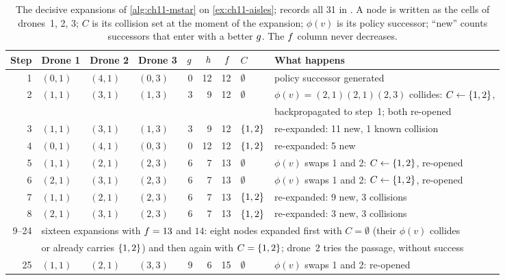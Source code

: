 \begin{table}[!tb]
  \centering\footnotesize
  \caption{The decisive expansions of \cref{alg:ch11-mstar} on
  \cref{ex:ch11-aisles};  records all 31 in
  . A
  node is written as the cells of drones~1, 2, 3; $C$ is its collision set
  at the moment of the expansion; $\phi(v)$ is its policy successor; ``new''
  counts successors that enter \Open with a better $g$. The $f$
  column never decreases.}
  \label{tab:ch11-trace}
  \setlength{\tabcolsep}{3.5pt}
  \begin{tabular}{@{}rlllrrrll@{}}
  \toprule
  Step & Drone 1 & Drone 2 & Drone 3 & $g$ & $h$ & $f$ & $C$ & What happens\\
  \midrule
   1 & $(0,1)$ & $(4,1)$ & $(0,3)$ &  0 & 12 & 12 & $\emptyset$ & policy successor generated\\
   2 & $(1,1)$ & $(3,1)$ & $(1,3)$ &  3 &  9 & 12 & $\emptyset$ & $\phi(v) = (2,1)(2,1)(2,3)$ collides: $C \gets \left\{ 1,2 \right\}$,\\
     &         &         &         &    &    &    &             & \quad backpropagated to step~1; both re-opened\\
   3 & $(1,1)$ & $(3,1)$ & $(1,3)$ &  3 &  9 & 12 & $\left\{ 1,2 \right\}$ & re-expanded: 11 new, 1 known collision\\
   4 & $(0,1)$ & $(4,1)$ & $(0,3)$ &  0 & 12 & 12 & $\left\{ 1,2 \right\}$ & re-expanded: 5 new\\
   5 & $(1,1)$ & $(2,1)$ & $(2,3)$ &  6 &  7 & 13 & $\emptyset$ & $\phi(v)$ swaps 1 and 2: $C \gets \left\{ 1,2 \right\}$, re-opened\\
   6 & $(2,1)$ & $(3,1)$ & $(2,3)$ &  6 &  7 & 13 & $\emptyset$ & $\phi(v)$ swaps 1 and 2: $C \gets \left\{ 1,2 \right\}$, re-opened\\
   7 & $(1,1)$ & $(2,1)$ & $(2,3)$ &  6 &  7 & 13 & $\left\{ 1,2 \right\}$ & re-expanded: 9 new, 3 collisions\\
   8 & $(2,1)$ & $(3,1)$ & $(2,3)$ &  6 &  7 & 13 & $\left\{ 1,2 \right\}$ & re-expanded: 3 new, 3 collisions\\
   9--24 & \multicolumn{8}{l}{sixteen expansions with $f = 13$ and $14$: eight nodes expanded first with $C = \emptyset$ (their $\phi(v)$ collides}\\
         & \multicolumn{8}{l}{\quad or already carries $\left\{ 1,2 \right\}$) and then again with $C = \left\{ 1,2 \right\}$; drone~2 tries the passage, without success}\\
  25 & $(1,1)$ & $(2,1)$ & $(3,3)$ &  9 &  6 & 15 & $\emptyset$ & $\phi(v)$ swaps 1 and 2: re-opened\\

\end{tabular}
\end{table}
